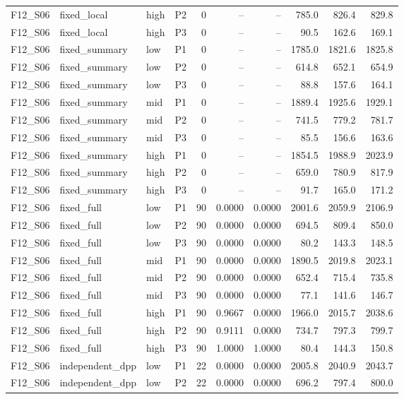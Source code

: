 \begin{longtable}{llllrrrrrr}
F12\_S06 & fixed\_local & high & P2 & 0 & -- & -- & 785.0 & 826.4 & 829.8 \\
F12\_S06 & fixed\_local & high & P3 & 0 & -- & -- & 90.5 & 162.6 & 169.1 \\
F12\_S06 & fixed\_summary & low & P1 & 0 & -- & -- & 1785.0 & 1821.6 & 1825.8 \\
F12\_S06 & fixed\_summary & low & P2 & 0 & -- & -- & 614.8 & 652.1 & 654.9 \\
F12\_S06 & fixed\_summary & low & P3 & 0 & -- & -- & 88.8 & 157.6 & 164.1 \\
F12\_S06 & fixed\_summary & mid & P1 & 0 & -- & -- & 1889.4 & 1925.6 & 1929.1 \\
F12\_S06 & fixed\_summary & mid & P2 & 0 & -- & -- & 741.5 & 779.2 & 781.7 \\
F12\_S06 & fixed\_summary & mid & P3 & 0 & -- & -- & 85.5 & 156.6 & 163.6 \\
F12\_S06 & fixed\_summary & high & P1 & 0 & -- & -- & 1854.5 & 1988.9 & 2023.9 \\
F12\_S06 & fixed\_summary & high & P2 & 0 & -- & -- & 659.0 & 780.9 & 817.9 \\
F12\_S06 & fixed\_summary & high & P3 & 0 & -- & -- & 91.7 & 165.0 & 171.2 \\
F12\_S06 & fixed\_full & low & P1 & 90 & 0.0000 & 0.0000 & 2001.6 & 2059.9 & 2106.9 \\
F12\_S06 & fixed\_full & low & P2 & 90 & 0.0000 & 0.0000 & 694.5 & 809.4 & 850.0 \\
F12\_S06 & fixed\_full & low & P3 & 90 & 0.0000 & 0.0000 & 80.2 & 143.3 & 148.5 \\
F12\_S06 & fixed\_full & mid & P1 & 90 & 0.0000 & 0.0000 & 1890.5 & 2019.8 & 2023.1 \\
F12\_S06 & fixed\_full & mid & P2 & 90 & 0.0000 & 0.0000 & 652.4 & 715.4 & 735.8 \\
F12\_S06 & fixed\_full & mid & P3 & 90 & 0.0000 & 0.0000 & 77.1 & 141.6 & 146.7 \\
F12\_S06 & fixed\_full & high & P1 & 90 & 0.9667 & 0.0000 & 1966.0 & 2015.7 & 2038.6 \\
F12\_S06 & fixed\_full & high & P2 & 90 & 0.9111 & 0.0000 & 734.7 & 797.3 & 799.7 \\
F12\_S06 & fixed\_full & high & P3 & 90 & 1.0000 & 1.0000 & 80.4 & 144.3 & 150.8 \\
F12\_S06 & independent\_dpp & low & P1 & 22 & 0.0000 & 0.0000 & 2005.8 & 2040.9 & 2043.7 \\
F12\_S06 & independent\_dpp & low & P2 & 22 & 0.0000 & 0.0000 & 696.2 & 797.4 & 800.0 \\

\end{longtable}
